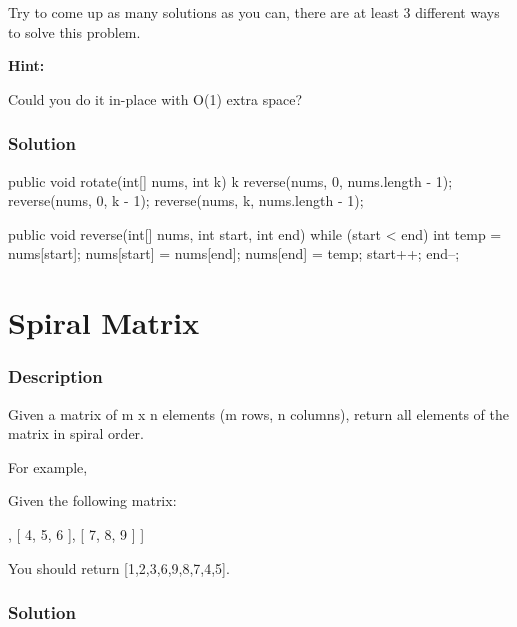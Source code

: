 Try to come up as many solutions as you can, there are at least 3 different ways to solve this problem.

\textbf{Hint:}

Could you do it in-place with O(1) extra space?

\subsubsection{Solution}

\begin{Code}
public void rotate(int[] nums, int k) {
    k %
    reverse(nums, 0, nums.length - 1);
    reverse(nums, 0, k - 1);
    reverse(nums, k, nums.length - 1);
}

public void reverse(int[] nums, int start, int end) {
    while (start < end) {
        int temp = nums[start];
        nums[start] = nums[end];
        nums[end] = temp;
        start++;
        end--;
    }
}
\end{Code}

\newpage

\section{Spiral Matrix} %

\subsubsection{Description}
Given a matrix of m x n elements (m rows, n columns), return all elements of the matrix in spiral order.

For example,

Given the following matrix:
\begin{Code}
[
 [ 1, 2, 3 ],
 [ 4, 5, 6 ],
 [ 7, 8, 9 ]
]
\end{Code}

You should return [1,2,3,6,9,8,7,4,5].


\subsubsection{Solution}

